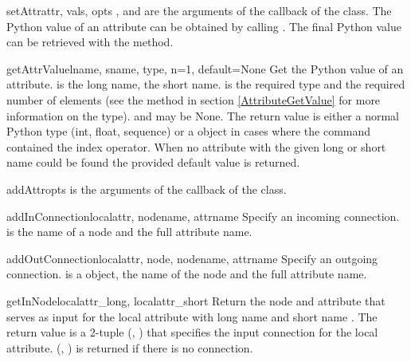 \begin{methoddesc}{setAttr}{attr, vals, opts}
,  and  are the arguments of the 
 callback of the  class. The Python
value of an attribute can be obtained by calling .
The final Python value can be retrieved with the 
 method.
\end{methoddesc}

\begin{methoddesc}{getAttrValue}{lname, sname, type, n=1, default=None}
Get the Python value of an attribute.
 is the long name,  the short name. 
is the required type and  the required number of elements 
(see the  method in section \ref{AttributeGetValue} for more information on the type). 
 and  may be None.
The return value is either a normal Python type (int, float, sequence)
or a  object in cases where the 
command contained the index operator. When no attribute with the given long
or short name could be found the provided default value is returned.
\end{methoddesc}

\begin{methoddesc}{addAttr}{opts}
 is the arguments of the  callback of 
the  class.
\end{methoddesc}

\begin{methoddesc}{addInConnection}{localattr, nodename, attrname}
Specify an incoming connection.
 is the name of a node and  the full 
attribute name.
\end{methoddesc}

\begin{methoddesc}{addOutConnection}{localattr, node, nodename, attrname}
Specify an outgoing connection.
 is a  object,  the name of the 
node and  the full attribute name.
\end{methoddesc}

\begin{methoddesc}{getInNode}{localattr_long, localattr_short}
Return the node and attribute that serves as input for the local
attribute with long name  and short name
. The return value is a 2-tuple (,
) that specifies the input connection for the 
local attribute. (, ) is returned if there is 
no connection.
\end{methoddesc}

